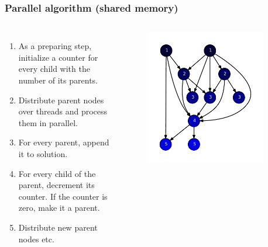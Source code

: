 \begin{frame}
\frametitle{Parallel algorithm (shared memory)}
\begin{columns}[T]
  \begin{enumerate}
    \item As a preparing step, initialize a counter for every child with the number of its parents.
    \item Distribute parent nodes over threads and process them in parallel.
    \item For every parent, append it to solution.
    \item For every child of the parent, decrement its counter. If the counter is zero, make it a parent.
    \item Distribute new parent nodes etc.
  \end{enumerate}

  \begin{figure}[!ht]
    \begin{center}
      \includegraphics[width=0.9\textwidth]{img/software10.pdf}
    \end{center}
  \end{figure}
\end{columns}

\end{frame}


